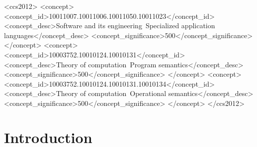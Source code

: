 \documentclass[sigplan,review]{acmart}
\begin{document}
\begin{CCSXML}
<ccs2012>
   <concept>
       <concept_id>10011007.10011006.10011050.10011023</concept_id>
       <concept_desc>Software and its engineering~Specialized application languages</concept_desc>
       <concept_significance>500</concept_significance>
       </concept>
   <concept>
       <concept_id>10003752.10010124.10010131</concept_id>
       <concept_desc>Theory of computation~Program semantics</concept_desc>
       <concept_significance>500</concept_significance>
       </concept>
   <concept>
       <concept_id>10003752.10010124.10010131.10010134</concept_id>
       <concept_desc>Theory of computation~Operational semantics</concept_desc>
       <concept_significance>500</concept_significance>
       </concept>
 </ccs2012>
\end{CCSXML}





\maketitle

\section{Introduction}
\end{document}
